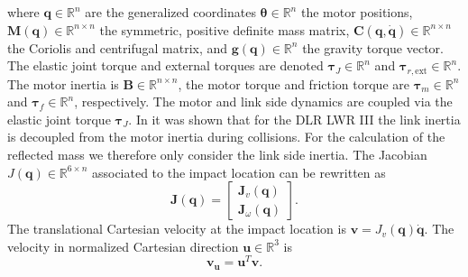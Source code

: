 where $\mathbf{q} \in \mathbb{R}^n$ are the generalized coordinates $\mathbf{\theta} \in \mathbb{R}^n$ the motor positions, $\mathbf{M}(\mathbf{q})  \in \mathbb{R}^{n \times n}$ the symmetric, positive definite mass matrix, $\mathbf{C}(\mathbf{q}, \dot{\mathbf{q}})  \in \mathbb{R}^{n \times n}$ the Coriolis and centrifugal matrix, and $\mathbf{g}(\mathbf{q}) \in \mathbb{R}^n$ the gravity torque vector. The elastic joint torque and external torques are denoted $\mathbf{\tau}_J  \in \mathbb{R}^n$ and $\mathbf{\tau}_{r,\mathrm{ext}} \in \mathbb{R}^n$. The motor inertia is $\mathbf{B} \in \mathbb{R}^{n \times n}$, the motor torque and friction torque are $\mathbf{\tau}_m \in \mathbb{R}^n$ and $\mathbf{\tau}_f \in \mathbb{R}^n$, respectively. The motor and link side dynamics are coupled via the elastic joint torque $\mathbf{\tau}_J$.
In \cite{haddadin_et_al_ijrr2009} it was shown that for the DLR LWR III the link inertia is decoupled from the motor inertia during collisions. For the calculation of the reflected mass we therefore only consider the link side inertia. The Jacobian $J(\mathbf{q}) \in \mathbb{R}^{6 \times n}$ associated to the impact location can be rewritten as
\begin{equation}
\mathbf{J}(\mathbf{q}) = 
\begin{bmatrix}
\mathbf{J}_{v}(\mathbf{q}) \\
\mathbf{J}_{\omega}(\mathbf{q})
\end{bmatrix}.
\label{eq:jacobian_expanded}
\end{equation}
The translational Cartesian velocity at the impact location is 
$\mathbf{v} = J_{v}({\mathbf{q}}) \dot{\mathbf{q}}$. The velocity in normalized Cartesian direction $\mathbf{u} \in \mathbb{R}^3$ is 
\begin{equation}
\mathbf{v_u} = \mathbf{u}^T \mathbf{v} .
\end{equation}

